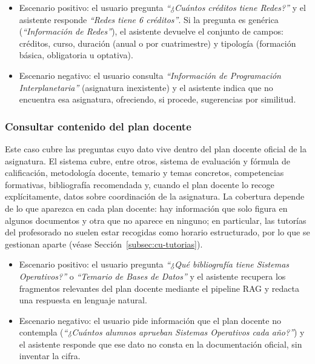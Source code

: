 \begin{itemize}
    \item Escenario positivo: el usuario pregunta \textit{``¿Cuántos créditos tiene Redes?''} y el asistente responde \textit{``Redes tiene 6 créditos''}. Si la pregunta es genérica (\textit{``Información de Redes''}), el asistente devuelve el conjunto de campos: créditos, curso, duración (anual o por cuatrimestre) y tipología (formación básica, obligatoria u optativa).
    \item Escenario negativo: el usuario consulta \textit{``Información de Programación Interplanetaria''} (asignatura inexistente) y el asistente indica que no encuentra esa asignatura, ofreciendo, si procede, sugerencias por similitud.
\end{itemize}

\subsubsection{Consultar contenido del plan docente}

Este caso cubre las preguntas cuyo dato vive dentro del plan docente oficial de la asignatura. El sistema cubre, entre otros, sistema de evaluación y fórmula de calificación, metodología docente, temario y temas concretos, competencias formativas, bibliografía recomendada y, cuando el plan docente lo recoge explícitamente, datos sobre coordinación de la asignatura. La cobertura depende de lo que aparezca en cada plan docente: hay información que solo figura en algunos documentos y otra que no aparece en ninguno; en particular, las tutorías del profesorado no suelen estar recogidas como horario estructurado, por lo que se gestionan aparte (véase Sección~\ref{subsec:cu-tutorias}).

\begin{itemize}
    \item Escenario positivo: el usuario pregunta \textit{``¿Qué bibliografía tiene Sistemas Operativos?''} o \textit{``Temario de Bases de Datos''} y el asistente recupera los fragmentos relevantes del plan docente mediante el pipeline RAG y redacta una respuesta en lenguaje natural.
    \item Escenario negativo: el usuario pide información que el plan docente no contempla (\textit{``¿Cuántos alumnos aprueban Sistemas Operativos cada año?''}) y el asistente responde que ese dato no consta en la documentación oficial, sin inventar la cifra.
\end{itemize}

